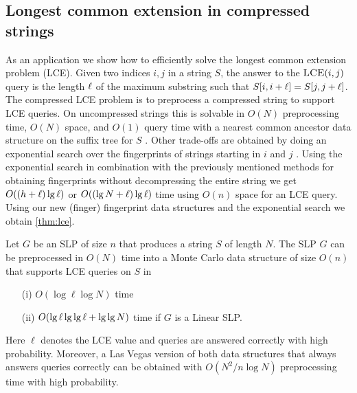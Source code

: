 \subsection{Longest common extension in compressed strings}
As an application we show how to efficiently solve the longest common extension problem (LCE).
Given two indices $i, j$ in a string $S$, the answer to the $\textsc{LCE}(i, j)$ query is the length $\ell$ of the maximum substring such that $S[i, i+\ell] = S[j, j+\ell]$. The compressed LCE problem is to preprocess a compressed string to support LCE queries. On uncompressed strings this is solvable in $O(N)$ preprocessing time, $O(N)$ space, and $O(1)$ query time with a nearest common ancestor data structure on the suffix tree for $S$ \cite{HT1984}. Other trade-offs are obtained by doing an exponential search over the fingerprints of strings starting in $i$ and $j$ \cite{bille12lce}. Using the exponential search in combination with the previously mentioned methods for obtaining fingerprints without decompressing the entire string we get $O((h+\ell)\lg \ell)$ or $O((\lg N+\ell)\lg \ell)$ time using $O(n)$ space for an LCE query. Using our new (finger) fingerprint data structures and the exponential search we obtain \autoref{thm:lce}.

\begin{theorem}\label{thm:lce}
Let $G$ be an SLP of size $n$ that produces a string $S$ of length $N$. The SLP $G$ can be preprocessed in $O(N)$ time into a Monte Carlo data structure of size $O(n)$ that supports LCE queries on $S$ in
\begin{enumerate}
\item[(i)] $O(\log \ell \log N)$ time
\item[(ii)] $O(\lg \ell \lg\lg \ell + \lg\lg N)$ time if $G$ is a Linear SLP.
\end{enumerate}
Here $\ell$ denotes the LCE value and queries are answered correctly with high probability. Moreover, a Las Vegas version of both data structures that always answers queries correctly can be obtained with
$O(N^2/n \log N)$ preprocessing time with high probability.
\end{theorem}

